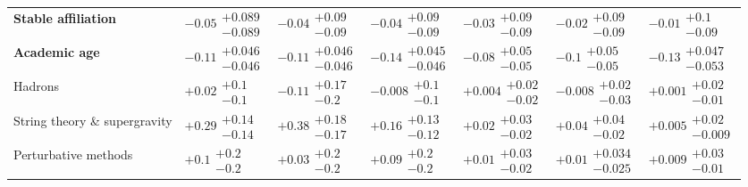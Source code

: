 \begin{table}[H]
\begin{tabular}{lllllll}
\textbf{Stable affiliation} & $-0.05\substack{+0.089 \\ -0.089}$ & $-0.04\substack{+0.09 \\ -0.09}$ & $-0.04\substack{+0.09 \\ -0.09}$ & $-0.03\substack{+0.09 \\ -0.09}$ & $-0.02\substack{+0.09 \\ -0.09}$ & $-0.01\substack{+0.1 \\ -0.09}$ \\
\textbf{Academic age} & $\bm{-0.11}\substack{+0.046 \\ -0.046}$ & $\bm{-0.11}\substack{+0.046 \\ -0.046}$ & $\bm{-0.14}\substack{+0.045 \\ -0.046}$ & $\bm{-0.08}\substack{+0.05 \\ -0.05}$ & $\bm{-0.1}\substack{+0.05 \\ -0.05}$ & $\bm{-0.13}\substack{+0.047 \\ -0.053}$ \\
\hline Hadrons & $+0.02\substack{+0.1 \\ -0.1}$ & $-0.11\substack{+0.17 \\ -0.2}$ & $-0.008\substack{+0.1 \\ -0.1}$ & $+0.004\substack{+0.02 \\ -0.02}$ & $-0.008\substack{+0.02 \\ -0.03}$ & $+0.001\substack{+0.02 \\ -0.01}$ \\
String theory \& supergravity & $\bm{+0.29}\substack{+0.14 \\ -0.14}$ & $\bm{+0.38}\substack{+0.18 \\ -0.17}$ & $\bm{+0.16}\substack{+0.13 \\ -0.12}$ & $\bm{+0.02}\substack{+0.03 \\ -0.02}$ & $\bm{+0.04}\substack{+0.04 \\ -0.02}$ & $+0.005\substack{+0.02 \\ -0.009}$ \\
Perturbative methods & $+0.1\substack{+0.2 \\ -0.2}$ & $+0.03\substack{+0.2 \\ -0.2}$ & $+0.09\substack{+0.2 \\ -0.2}$ & $+0.01\substack{+0.03 \\ -0.02}$ & $+0.01\substack{+0.034 \\ -0.025}$ & $+0.009\substack{+0.03 \\ -0.01}$ \\

\end{tabular}
\end{table}
